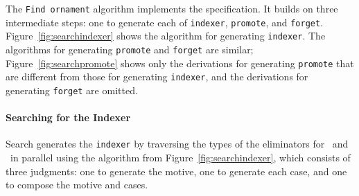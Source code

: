 The \lstinline{Find ornament} algorithm implements the specification.
It builds on three intermediate steps: one to generate each of \lstinline{indexer},
\lstinline{promote}, and \lstinline{forget}. 
Figure~\ref{fig:searchindexer} shows the algorithm for generating \lstinline{indexer}.
The algorithms for generating \lstinline{promote} and \lstinline{forget} are similar;
Figure~\ref{fig:searchpromote} shows only the derivations for generating \lstinline{promote}
that are different from those for generating \lstinline{indexer}, and 
the derivations for generating \lstinline{forget} are omitted.

\paragraph{Searching for the Indexer}

Search generates the \lstinline{indexer} by traversing the types of the eliminators for \Aa\ and \B\ in parallel using the algorithm from Figure~\ref{fig:searchindexer},
which consists of three judgments: one to generate the motive, one to generate each case,
and one to compose the motive and cases.

